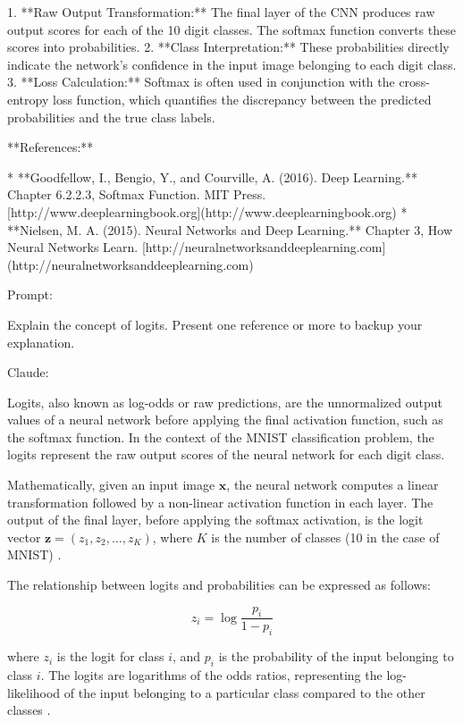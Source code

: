 1. **Raw Output Transformation:** The final layer of the CNN produces raw output scores for each of the 10 digit classes. The softmax function converts these scores into probabilities.
2. **Class Interpretation:** These probabilities directly indicate the network's confidence in the input image belonging to each digit class.
3. **Loss Calculation:**  Softmax is often used in conjunction with the cross-entropy loss function, which quantifies the discrepancy between the predicted probabilities and the true class labels.

**References:**

* **Goodfellow, I., Bengio, Y., and Courville, A. (2016). Deep Learning.** Chapter 6.2.2.3, Softmax Function. MIT Press. [http://www.deeplearningbook.org](http://www.deeplearningbook.org) 
* **Nielsen, M. A. (2015). Neural Networks and Deep Learning.** Chapter 3, How Neural Networks Learn.  [http://neuralnetworksanddeeplearning.com](http://neuralnetworksanddeeplearning.com)


Prompt:

Explain the concept of logits. Present one reference or more to backup your explanation. 

Claude:

Logits, also known as log-odds or raw predictions, are the unnormalized output values of a neural network before applying the final activation function, such as the softmax function. In the context of the MNIST classification problem, the logits represent the raw output scores of the neural network for each digit class.

Mathematically, given an input image $\mathbf{x}$, the neural network computes a linear transformation followed by a non-linear activation function in each layer. The output of the final layer, before applying the softmax activation, is the logit vector $\mathbf{z} = (z_1, z_2, \dots, z_K)$, where $K$ is the number of classes (10 in the case of MNIST) \cite{goodfellow2016deep}.

The relationship between logits and probabilities can be expressed as follows:

\begin{equation}
z_i = \log \frac{p_i}{1 - p_i}
\end{equation}

where $z_i$ is the logit for class $i$, and $p_i$ is the probability of the input belonging to class $i$. The logits are logarithms of the odds ratios, representing the log-likelihood of the input belonging to a particular class compared to the other classes \cite{bishop2006pattern}.

